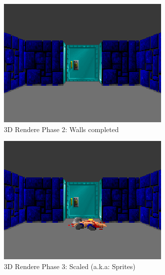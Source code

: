  
 \begin{figure}[H]
\centering
 \includegraphics[width=\textwidth]{screenshots/wolf4d_2_walls.png}
 \caption{3D Rendere Phase 2: Walls completed} 
 \end{figure}
 
 
 \begin{figure}[H]
\centering
 \includegraphics[width=\textwidth]{screenshots/wolf3d_6_scaled}
 \caption{3D Rendere Phase 3: Scaled (a.k.a: Sprites)} 
 \end{figure}

